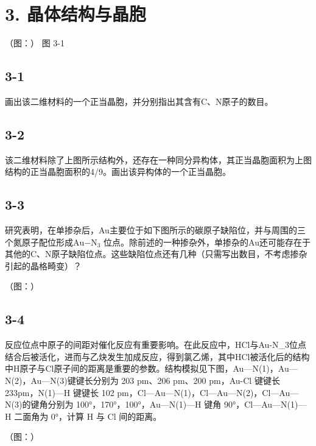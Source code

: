 \section*{3. 晶体结构与晶胞}
（图：）
图 3-1

\subsection*{3-1}
画出该⼆维材料的⼀个正当晶胞，并分别指出其含有C、N原⼦的数⽬。

\subsection*{3-2}
该⼆维材料除了上图所⽰结构外，还存在⼀种同分异构体，其正当晶胞⾯积为上图结构的正当晶胞⾯积的4/9。画出该异构体的⼀个正当晶胞。

\subsection*{3-3}
研究表明，在单掺杂后，Au主要位于如下图所⽰的碳原⼦缺陷位，并与周围的三个氮原⼦配位形成$\mathrm { A u { - N _ { 3 } } }$ 位点。除前述的⼀种掺杂外，单掺杂的Au还可能存在于其他的C、N原⼦缺陷位点。这些缺陷位点还有⼏种（只需写出数⽬，不考虑掺杂引起的晶格畸变）？

（图：）

\subsection*{3-4}
反应位点中原⼦的间距对催化反应有重要影响。在此反应中，HCl与Au-N_{3}位点结合后被活化，进⽽与⼄炔发⽣加成反应，得到氯⼄烯，其中HCl被活化后的结构中H原⼦与Cl原⼦间的距离是重要的参数。结构模拟⻅下图，Au—N(1)，Au—N(2)，Au—N(3)键键⻓分别为 203 pm、206 pm、200 pm，Au-Cl 键键⻓ 233pm，N(1)—H 键键⻓ 102 pm，Cl—Au—N(1)，Cl—Au—N(2)，Cl—Au—N(3)的键⻆分别为 100°，170°，100°，Au—N(1)—H 键⻆ 90°，Cl—Au—N(1)—H ⼆⾯⻆为 0°，计算 H 与 Cl 间的距离。

（图：）
